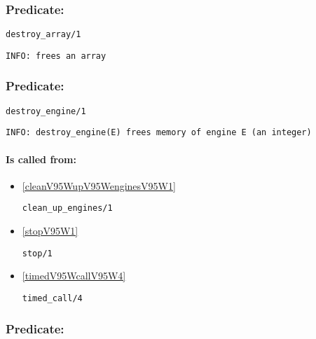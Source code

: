 \subsubsection{Predicate:} \label{destroyV95WarrayV95W1}

\begin{verbatim}
destroy_array/1
\end{verbatim}

{\small \begin{verbatim}
INFO: frees an array

\end{verbatim}}

\subsubsection{Predicate:} \label{destroyV95WengineV95W1}

\begin{verbatim}
destroy_engine/1
\end{verbatim}

{\small \begin{verbatim}
INFO: destroy_engine(E) frees memory of engine E (an integer)

\end{verbatim}}
\paragraph{Is called from:} 
\begin{itemize}
\item \ref{cleanV95WupV95WenginesV95W1} 
\begin{verbatim}
clean_up_engines/1
\end{verbatim}

\item \ref{stopV95W1} 
\begin{verbatim}
stop/1
\end{verbatim}

\item \ref{timedV95WcallV95W4} 
\begin{verbatim}
timed_call/4
\end{verbatim}

\end{itemize}

\subsubsection{Predicate:} \label{detV95WcallV95W1}

